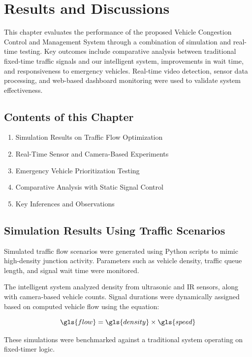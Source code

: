 \documentclass[12pt]{report}
\begin{document}
\vspace{0.5cm}



\chapter{Results and Discussions}

This chapter evaluates the performance of the proposed Vehicle Congestion Control and Management System through a combination of simulation and real-time testing. Key outcomes include comparative analysis between traditional fixed-time traffic signals and our intelligent system, improvements in wait time, and responsiveness to emergency vehicles. Real-time video detection, sensor data processing, and web-based dashboard monitoring were used to validate system effectiveness.

\section{Contents of this Chapter}
\begin{enumerate}
    \item Simulation Results on Traffic Flow Optimization
    \item Real-Time Sensor and Camera-Based Experiments
    \item Emergency Vehicle Prioritization Testing
    \item Comparative Analysis with Static Signal Control
    \item Key Inferences and Observations
\end{enumerate}

\section{Simulation Results Using Traffic Scenarios}

Simulated traffic flow scenarios were generated using Python scripts to mimic high-density junction activity. Parameters such as vehicle density, traffic queue length, and signal wait time were monitored.

The intelligent system analyzed density from ultrasonic and IR sensors, along with camera-based vehicle counts. Signal durations were dynamically assigned based on computed vehicle flow using the equation:

\[
\gls{flow} = \gls{density} \times \gls{speed}
\]

These simulations were benchmarked against a traditional system operating on fixed-timer logic.
\end{document}

